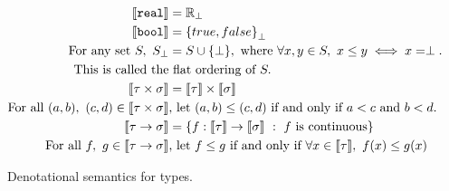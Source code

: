 \begin{figure}
 \begin{align*}
\llbracket \texttt{real} \rrbracket &= \mathbb{R}_{\perp} \\
 \llbracket \texttt{bool} \rrbracket &= {\{true, false\}}_{\perp} \\
\text{For any set } S, \ S_{\perp} &= S \cup \{\perp\}, \text{ where }\forall x, y\in S, \ x \leq y \iff x = \perp. \\
 \text{This is called the}&\text{ flat ordering of } S.\\
 \llbracket \tau \times \sigma \rrbracket &= \llbracket \tau \rrbracket \times \llbracket \sigma \rrbracket  \\
 \text{For all } (a, b), \ (c, d) \in \llbracket \tau \times \sigma \rrbracket &\text{, let }  (a,b) \leq (c,d) \text{ if and only if } a<c \text{ and } b<d. \\ 
 \llbracket \tau \rightarrow \sigma \rrbracket &= \{f: \llbracket \tau \rrbracket \rightarrow \llbracket \sigma \rrbracket \ : 
 \ f \text{ is continuous}\} \\
 \text{ For all } f, \ g \in \llbracket \tau \rightarrow \sigma \rrbracket &\text{, let } f \leq g \text{ if and only if } \forall x \in 
 \llbracket \tau \rrbracket, \ f(x) \leq g(x) 
 \end{align*}
 \caption{Denotational semantics for types.}
 \end{figure}
